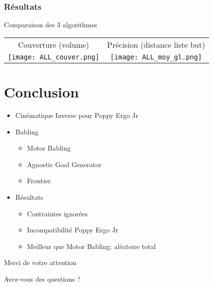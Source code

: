 \documentclass[french]{beamer}
\begin{document}

\begin{frame}
    \frametitle{Résultats}

    Comparaison des 3 algorithmes
    \vfill

    \begin{tabular}{c c}
        Couverture (volume) & Précision (distance liste but)
        \\
        \texttt{[image: ALL\_couver.png]} &
        \texttt{[image: ALL\_moy\_gl.png]}
    \end{tabular}
\end{frame}

\section{Conclusion}

\begin{frame}

    \begin{itemize}
        \item Cinématique Inverse pour Poppy Ergo Jr
        \item Babling
        \begin{itemize}
            \item Motor Babling
            \item Agnostic Goal Generator
            \item Frontier
        \end{itemize}
        \item Résultats
        \begin{itemize}
            \item Contraintes ignorées
            \item Incompatibilité Poppy Ergo Jr
            \item Meilleur que Motor Babling: aléatoire total
        \end{itemize}
    \end{itemize}
\end{frame}


\begin{frame}
    \center
    \Huge Merci de votre attention
    
    Avez-vous des questions ?
\end{frame}


\begin{frame}
    \footnotesize
    
    
\end{frame}
\end{document}

